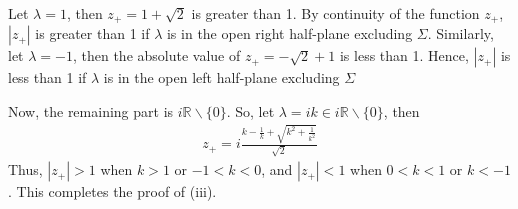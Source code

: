 \documentclass[a4paper,12pt]{article}
\theoremstyle{plain}
\theoremstyle{definition}
\theoremstyle{definition}
\begin{document}
Let $\lambda =1$, then $z_+ =1+\sqrt{2}$ is greater than 1. 
By continuity of the function $z_+$, $|z_+|$ is greater than 1 if $\lambda$ is in the open right half-plane excluding $\Sigma$. Similarly, let $\lambda =-1$, then the absolute value of $z_+ = -\sqrt{2} +1$ is less than 1. Hence, $|z_+|$ is less than 1 if $\lambda$ is in the open left half-plane excluding $\Sigma$

Now, the remaining part is $i\mathbb{R}\backslash\{0\}$. 
So, let $\lambda =ik \in i\mathbb{R}\backslash\{0\}$, then
\begin{align*}
    z_{+}= i\frac{k-\frac{1}{k}+\sqrt{k^2+\frac{1}{k^2}}}{\sqrt{2}}
\end{align*}
Thus, $|z_{+}|>1$ when $k>1$ or $-1<k<0$, and $|z_{+}|<1$ when $0<k<1$ or $k<-1$.
This completes the proof of (iii).






\end{document}
